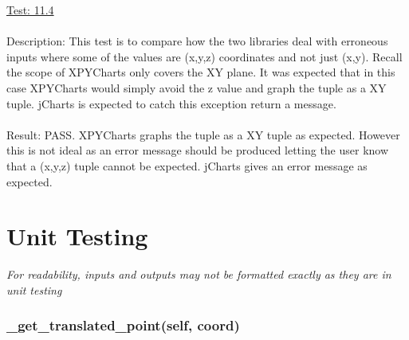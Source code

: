 \documentclass[12pt, titlepage]{article}
\begin{document}
\underline{Test: 11.4}\\\\\label{sec:11.4}
Description: This test is to compare how the two libraries deal with erroneous inputs where some of the values are (x,y,z) coordinates and not just (x,y). Recall the scope of XPYCharts only covers the XY plane. It was expected that in this case XPYCharts would simply avoid the z value and graph the tuple as a XY tuple. jCharts is expected to catch this exception return a message.\\\\

Result: PASS. XPYCharts graphs the tuple as a XY tuple as expected. However this is not ideal as an error message should be produced letting the user know that a (x,y,z) tuple cannot be expected. jCharts gives an error message as expected.\\

\section{Unit Testing}\label{sec:unittest}
\textit{For readability, inputs and outputs may not be formatted exactly as they are in unit testing}

\subsubsection{\_get\_translated\_point(self, coord)}		
	\label{sec:4.0.1}
\end{document}
